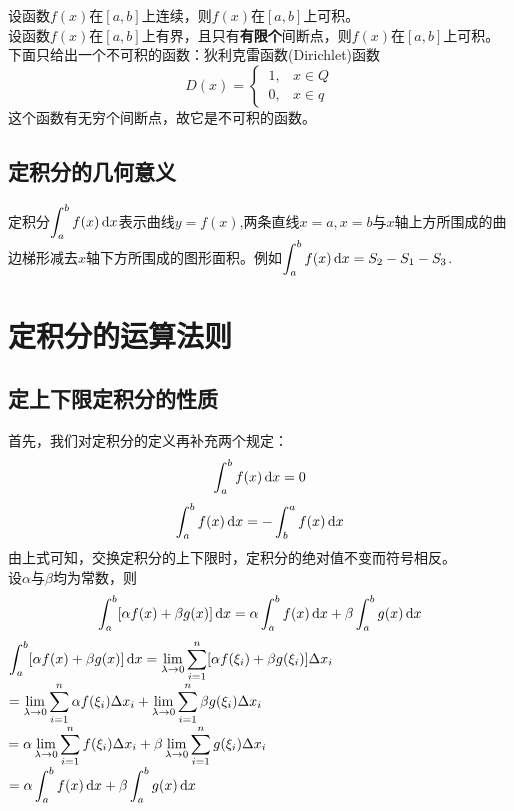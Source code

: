 \sj
\theorem[积分存在条件1]
设函数$f(x)$在$[a,b]$上连续，则$f(x)$在$[a,b]$上可积。\\

\sj
\theorem[积分存在条件2]
设函数$f(x)$在$[a,b]$上有界，且只有\textbf{有限个}间断点，则$f(x)$在$[a,b]$上可积。
下面只给出一个不可积的函数：狄利克雷函数(Dirichlet)函数
\begin{equation}
	\nonumber
	D(x)=\begin{cases}
		\, 1, & x \in Q \\
		\, 0, & x \in q
	\end{cases}
\end{equation}
这个函数有无穷个间断点，故它是不可积的函数。
\subsection{定积分的几何意义}
定积分$\displaystyle\int_{a}^{b}f(x) \,{\rm{d}} x$表示曲线$y=f(x)$,两条直线$x=a,x=b$与$x$轴上方所围成的曲边梯形减去$x$轴下方所围成的图形面积。例如$\displaystyle\int_{a}^{b}f(x) \,{\rm{d}} x=S_2-S_1-S_3$.
\section{定积分的运算法则}
\subsection{定上下限定积分的性质}
首先，我们对定积分的定义再补充两个规定：
\begin{equation}
	\int_{a}^{b}f(x) \,{\rm{d}} x=0
\end{equation}
\begin{equation}
	\int_{a}^{b}f(x) \,{\rm{d}} x=-\int_{b}^{a}f(x) \,{\rm{d}} x
\end{equation}
由上式可知，交换定积分的上下限时，定积分的绝对值不变而符号相反。\\

\sj
\theorem[定上下限积分性质1]
设$\alpha$与$\beta$均为常数，则
\begin{equation}
	\int_{a}^{b}[\alpha f(x)+\beta g(x)] \,{\rm{d}} x=\alpha\int_{a}^{b}f(x) \,{\rm{d}} x+\beta\int_{a}^{b}g(x) \,{\rm{d}} x
\end{equation}
\proof $\displaystyle\int_{a}^{b}[\alpha f(x)+\beta g(x)] \,{\rm{d}} x=\lim\limits_{\lambda\to0}\sum_{i=1}^{n}[\alpha f(\xi_i)+\beta g(\xi_i)]\Delta x_i$\vspace{-1em}\\
\hspace*{14.7em}$=\displaystyle\lim\limits_{\lambda\to0}\sum_{i=1}^{n}\alpha f(\xi_i)\Delta x_i+\lim\limits_{\lambda\to0}\sum_{i=1}^{n}\beta g(\xi_i)\Delta x_i$\\
\hspace*{14.7em}$=\displaystyle\alpha\lim\limits_{\lambda\to0}\sum_{i=1}^{n}f(\xi_i)\Delta x_i+\beta\lim\limits_{\lambda\to0}\sum_{i=1}^{n}g(\xi_i)\Delta x_i$\\
\hspace*{14.7em}$=\alpha \displaystyle\int_{a}^{b}f(x)\,{\rm{d}} x+\beta \int_{a}^{b}g(x)\,{\rm{d}} x$\\

